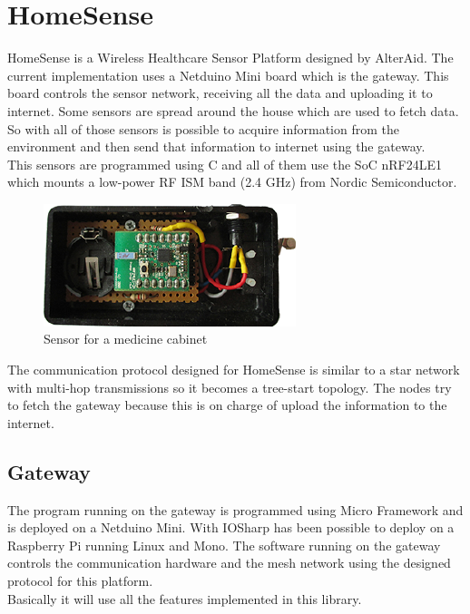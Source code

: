 \section{HomeSense}\label{S:IOEx-HomeSense}
HomeSense is a Wireless Healthcare Sensor Platform designed by AlterAid. The current implementation uses a Netduino Mini board which is the gateway. This board controls the sensor network, receiving all the data and uploading it to internet.
Some sensors are spread around the house which are used to fetch data. So with all of those sensors is possible to acquire information from the environment and then send that information to internet using the gateway.
\\
This sensors are programmed using C and all of them use the \gls{SoC} nRF24LE1 which mounts a low-power RF ISM band (2.4 GHz) from Nordic Semiconductor.
\begin{figure}[H]\begin{center}
 \centering
  \captionsetup{justification=centering}
  \includegraphics[scale=1]{pictures/examples/sensor}
  \caption{Sensor for a medicine cabinet\label{fig:IOEx-UART}}
\end{center}\end{figure}
The communication protocol designed for HomeSense is similar to a star network with multi-hop transmissions so it becomes a tree-start topology. The nodes try to fetch the gateway because this is on charge of upload the information to the internet.

\subsection{Gateway}\label{SS:IOEx-HomeSense-Gateway}
The program running on the gateway is programmed using Micro Framework and is deployed on a Netduino Mini. With IOSharp has been possible to deploy on a Raspberry Pi running Linux and Mono. The software running on the gateway controls the communication hardware and the mesh network using the designed protocol for this platform.
\\
Basically it will use all the features implemented in this library.

